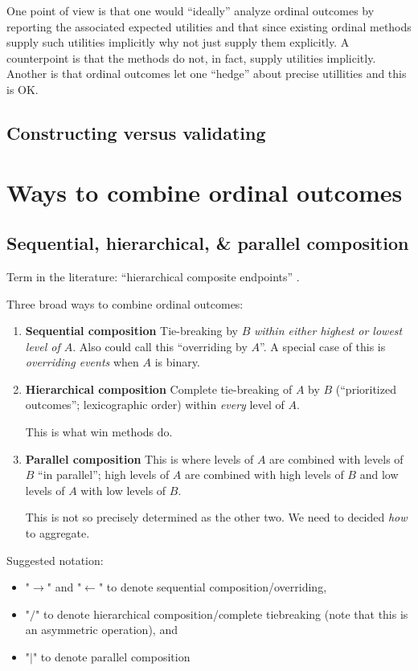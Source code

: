 \documentclass[
  11pt,
  fleqn
]{article}
\begin{document}
One point of view is that one would ``ideally'' analyze ordinal outcomes by
reporting the associated expected utilities  and that since existing ordinal methods supply
such utilities implicitly why not just supply them explicitly. A counterpoint
is that the methods do not, in fact, supply utilities implicitly.
Another is that ordinal outcomes let one ``hedge'' about precise
utillities and this is OK.

\subsection{Constructing versus validating}

\section{Ways to combine ordinal outcomes}

\subsection{Sequential,
hierarchical, \& parallel composition}

Term in the literature: ``hierarchical composite endpoints''
\citep{gasparyanDesignAnalysisStudies2022}.

Three broad ways to combine ordinal outcomes:
\begin{enumerate}
  \item \textbf{Sequential composition} Tie-breaking by $B$
    \emph{within either highest or lowest level of $A$}. Also could
    call this ``overriding by $A$''. A special case of this is
    \emph{overriding events} when $A$ is binary.
  \item \textbf{Hierarchical composition} Complete tie-breaking of $A$ by
    $B$ (``prioritized outcomes''; lexicographic order) within
    \emph{every} level of $A$.

    This is what win methods do.
  \item \textbf{Parallel composition} This is where levels of $A$ are
    combined with levels of $B$ ``in parallel''; high levels of $A$
    are combined with high levels of $B$ and low levels of $A$ with
    low levels of $B$.

    This is not so precisely determined as the other two. We need to
    decided \emph{how} to aggregate.
\end{enumerate}

Suggested notation:
\begin{itemize}
  \item "$\rightarrow$" and "$\leftarrow$" to denote sequential
    composition/overriding,
  \item "$/$" to denote hierarchical composition/complete tiebreaking
    (note that this is an asymmetric operation), and
  \item "$|$" to denote parallel composition
\end{itemize}
\end{document}
